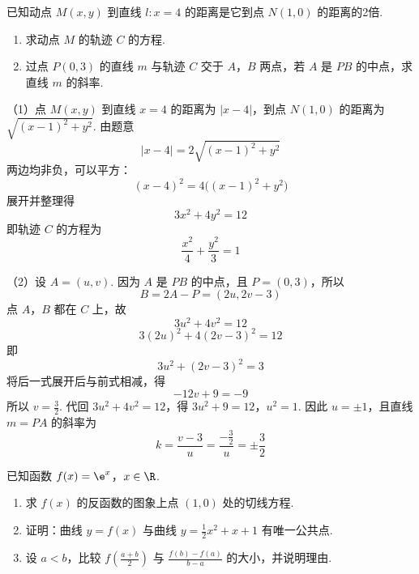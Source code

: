 \begin{problem}
已知动点 \(M(x, y)\) 到直线 \(l: x = 4\) 的距离是它到点 \(N(1,0)\) 的距离的2倍.

\begin{enumerate}
\item 求动点 \(M\) 的轨迹 \(C\) 的方程.
\item 过点 \(P(0,3)\) 的直线 \(m\) 与轨迹 \(C\) 交于 \(A\)，\(B\) 两点，若 \(A\) 是 \(PB\) 的中点，求直线 \(m\) 的斜率.
\end{enumerate}
\end{problem}

\begin{solution}
（1）点 \(M(x,y)\) 到直线 \(x=4\) 的距离为 \(|x-4|\)，到点 \(N(1,0)\) 的距离为 \(\sqrt{(x-1)^2+y^2}\). 由题意
\[
|x-4|=2\sqrt{(x-1)^2+y^2}
\]
两边均非负，可以平方：
\[
(x-4)^2=4\bigl((x-1)^2+y^2\bigr)
\]
展开并整理得
\[
3x^2+4y^2=12
\]
即轨迹 \(C\) 的方程为
\[
\frac{x^2}{4}+\frac{y^2}{3}=1
\]

（2）设 \(A=(u,v)\). 因为 \(A\) 是 \(PB\) 的中点，且 \(P=(0,3)\)，所以
\[
B=2A-P=(2u,2v-3)
\]
点 \(A\)，\(B\) 都在 \(C\) 上，故
\[
3u^2+4v^2=12
\]
\[
3(2u)^2+4(2v-3)^2=12
\]
即
\[
3u^2+(2v-3)^2=3
\]
将后一式展开后与前式相减，得
\[
-12v+9=-9
\]
所以 \(v=\frac32\). 代回 \(3u^2+4v^2=12\)，得
\(3u^2+9=12\)，\(u^2=1\).
因此 \(u=\pm1\)，且直线 \(m=PA\) 的斜率为
\[
k=\frac{v-3}{u}=\frac{-\frac32}{u}=\pm\frac32
\]
\end{solution}

\begin{problem}
已知函数 \(f(x) = \e^{x}\)，\(x \in \R\).

\begin{enumerate}
\item 求 \( f(x) \) 的反函数的图象上点 \((1,0)\) 处的切线方程.
\item 证明：曲线 \( y = f(x) \) 与曲线 \( y = \frac{1}{2} x^2 + x + 1 \) 有唯一公共点.
\item 设 \(a < b\)，比较 \(f\left(\frac{a + b}{2}\right)\) 与 \(\frac{f(b) - f(a)}{b - a}\) 的大小，并说明理由.
\end{enumerate}
\end{problem}


